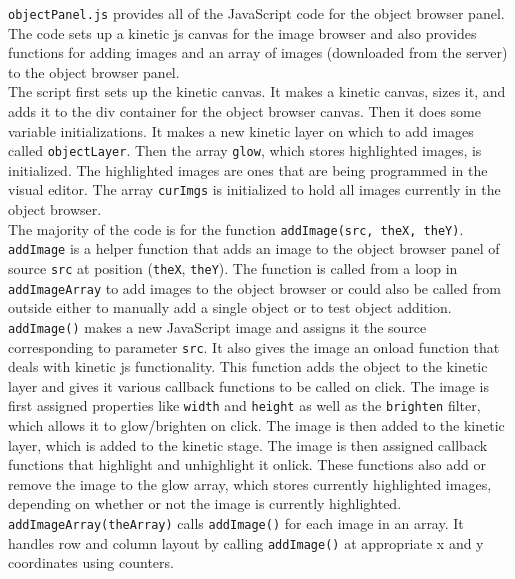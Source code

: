 \documentclass[12pt]{article}
\begin{document}
\texttt{objectPanel.js} provides all of the JavaScript code for the object browser panel. The code sets up a kinetic js canvas for the image browser and also provides functions for adding images and an array of images (downloaded from the server) to the object browser panel. \\

The script first sets up the kinetic canvas. It makes a kinetic canvas, sizes it, and adds it to the div container for the object browser canvas. Then it does some variable initializations. It makes a new kinetic layer on which to add images called \texttt{objectLayer}. Then the array \texttt{glow}, which stores highlighted images, is initialized. The highlighted images are ones that are being programmed in the visual editor. The array \texttt{curImgs} is initialized to hold all images currently in the object browser. \\

The majority of the code is for the function \texttt{addImage(src, theX, theY)}. \texttt{addImage} is a helper function that adds an image to the object browser panel of source \texttt{src} at position (\texttt{theX}, \texttt{theY}). The function is called from a loop in \texttt{addImageArray} to add images to the object browser or could also be called from outside either to manually add a single object or to test object addition. \\

\texttt{addImage()} makes a new JavaScript image and assigns it the source corresponding to parameter \texttt{src}. It also gives the image an onload function that deals with kinetic js functionality. This function adds the object to the kinetic layer and gives it various callback functions to be called on click. The image is first assigned properties like \texttt{width} and \texttt{height} as well as the \texttt{brighten} filter, which allows it to glow/brighten on click. The image is then added to the kinetic layer, which is added to the kinetic stage. The image is then assigned callback functions that highlight and unhighlight it onlick. These functions also add or remove the image to the glow array, which stores currently highlighted images, depending on whether or not the image is currently highlighted. \\

\texttt{addImageArray(theArray)} calls \texttt{addImage()} for each image in an array. It handles row and column layout by calling \texttt{addImage()} at appropriate x and y coordinates using counters. \\
\end{document}
